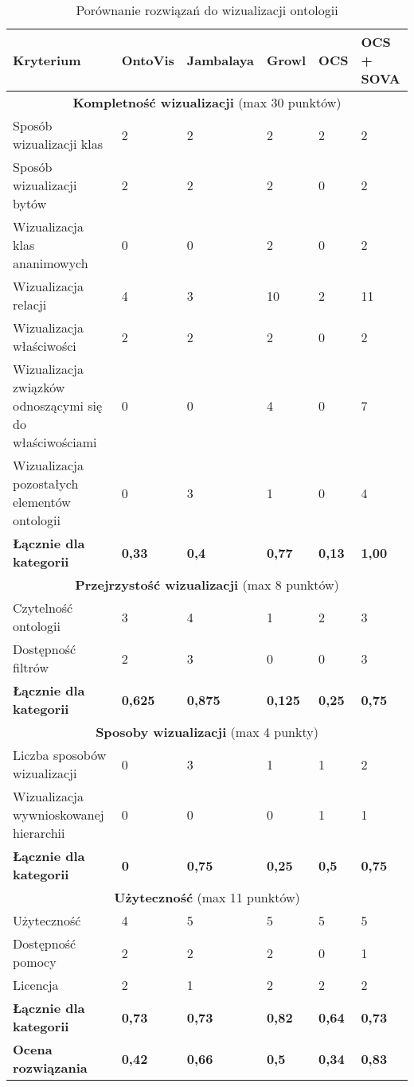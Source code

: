 \begin{longtable}{|m{6cm}|m{1.6cm}|m{1.6cm}|m{1.6cm}|m{1.6cm}|m{1.6cm}|}
\caption{Porównanie rozwiązań do wizualizacji ontologii}
\label{t:porownanie2}
 \\
\hline


 Kryterium  &  OntoVis  &  Jambalaya &  Growl & OCS & OCS + SOVA \\ \hline

 \multicolumn{6}{|c|}{{\bf Kompletność wizualizacji} (max 30 punktów)}  \\ \hline
Sposób wizualizacji klas	&  2  &  2  &  2  & 2 & 2 \\ \hline
Sposób wizualizacji bytów	&  2  &  2  &  2  & 0 & 2 \\ \hline
Wizualizacja klas ananimowych	&  0  &  0  &  2  & 0 & 2 \\ \hline
Wizualizacja relacji		&  4  &  3  &  10 & 2 & 11 \\ \hline
Wizualizacja właściwości	&  2  &  2  &  2  & 0 & 2 \\ \hline
Wizualizacja związków odnoszącymi
	   się do właściwościami&  0  &  0  &  4 & 0 & 7 \\ \hline
Wizualizacja pozostałych 
	  elementów ontologii   &  0  &  3  &  1 &  0 & 4 \\ \hline
{\bf Łącznie dla kategorii}	&{\bf 0,33 }   &{\bf 0,4  }   & {\bf 0,77 }  & {\bf 0,13 } & {\bf 1,00}\\ \hline %
 \multicolumn{6}{|c|}{{\bf Przejrzystość wizualizacji} (max 8 punktów)}\\ \hline
Czytelność ontologii		& 3  &  4 &  1 &  2 & 3 \\ \hline
Dostępność filtrów		& 2  &  3 &  0 &  0 & 3 \\ \hline
{\bf Łącznie dla kategorii}	&{\bf 0,625 }   &{\bf 0,875 }   & {\bf 0,125 }  & {\bf 0,25 } & {\bf 0,75} \\ \hline %
 \multicolumn{6}{|c|}{{\bf Sposoby wizualizacji} (max 4 punkty)} \\ \hline
Liczba sposobów wizualizacji		&  0 &  3 &  1 & 1 & 2  \\ \hline
Wizualizacja wywnioskowanej hierarchii	&  0 &  0 &  0 & 1 & 1 \\ \hline
{\bf Łącznie dla kategorii}	&{\bf 0 }   &{\bf 0,75 }   & {\bf 0,25 }  & {\bf 0,5 } & {\bf 0,75} \\ \hline %
 \multicolumn{6}{|c|}{{\bf Użyteczność} (max 11 punktów)}\\ \hline
Użyteczność			&  4 &  5 &  5 & 5 & 5 \\ \hline
Dostępność pomocy		&  2 &  2 &  2 & 0 & 1 \\ \hline
Licencja			&  2 &  1 &  2 & 2 & 2 \\ \hline
{\bf Łącznie dla kategorii}	&{\bf 0,73 }   &{\bf 0,73 }   & {\bf 0,82 }  & {\bf 0,64 } & {\bf 0,73} \\ \hline %
{\bf Ocena rozwiązania}		&{\bf 0,42 }   &{\bf 0,66 }   & {\bf 0,5}  & {\bf 0,34 }  & {\bf 0,83} \\ \hline
\end{longtable}



